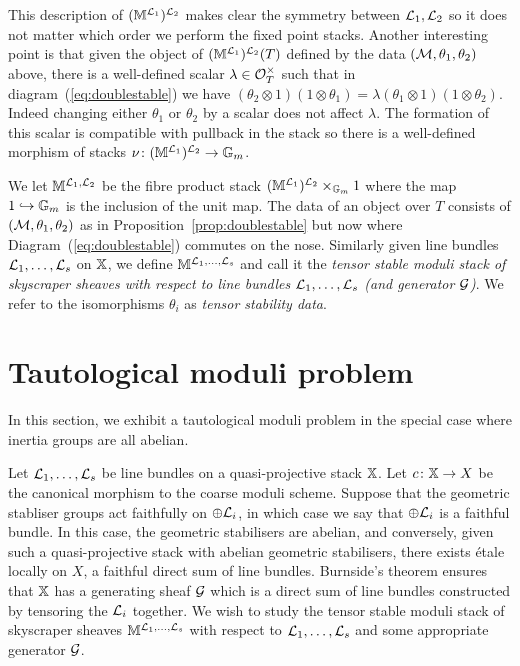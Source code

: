 \documentclass[12pt]{amsart}
\begin{document}
This description of $(\mathbb{M}^{\mathcal{L}_1})^{\mathcal{L}_2}$ makes clear the symmetry between $\mathcal{L}_1, \mathcal{L}_2$ so it does not matter which order we perform the fixed point stacks. Another interesting point is that given the object of $(\mathbb{M}^{\mathcal{L}_1})^{\mathcal{L}_2}(T)$ defined by the data $(\mathcal{M}, \theta_1, \theta_2)$ above, there is a well-defined scalar $\lambda \in \mathcal{O}_T^{\times}$ such that in diagram~(\ref{eq:doublestable}) we have $(\theta_2 \otimes 1) (1 \otimes \theta_1) = \lambda (\theta_1 \otimes 1) (1 \otimes \theta_2)$. Indeed changing either $\theta_1$ or 
$\theta_2$ by a scalar does not affect $\lambda$. The formation of this scalar is compatible with pullback in the stack so there is a well-defined morphism of stacks $\nu \colon (\mathbb{M}^{\mathcal{L}_1})^{\mathcal{L}_2} \rightarrow \mathbb{G}_m$. 

\begin{definition}  \label{defn:doubletensor}
We let $\mathbb{M}^{\mathcal{L}_1,\mathcal{L}_2}$ be the fibre product stack $(\mathbb{M}^{\mathcal{L}_1})^{\mathcal{L}_2} \times_{\mathbb{G}_m} 1$ where the map $1 \hookrightarrow \mathbb{G}_m$ is the inclusion of the unit map. The data of an object over $T$ consists of $(\mathcal{M}, \theta_1, \theta_2)$ as in Proposition~\ref{prop:doublestable} but now where Diagram~(\ref{eq:doublestable}) commutes on the nose. Similarly given line bundles $\mathcal{L}_1,\ldots,\mathcal{L}_s$ on $\mathbb{X}$, we define $\mathbb{M}^{\mathcal{L}_1,\ldots,\mathcal{L}_s}$ and call it the {\em tensor stable moduli stack of skyscraper sheaves with respect to line bundles $\mathcal{L}_1, \ldots, \mathcal{L}_s$ (and generator $\mathcal{G}$)}. We refer to the isomorphisms $\theta_i$ as {\em tensor stability data}.
\end{definition}



\section{Tautological moduli problem}

In this section, we exhibit a tautological moduli problem in the special case where inertia groups are all abelian.

Let $\mathcal{L}_1, \ldots, \mathcal{L}_s$ be line bundles on a quasi-projective stack $\mathbb{X}$. Let $c \colon \mathbb{X} \to X$ be the canonical morphism to the coarse moduli scheme. Suppose that the geometric stabliser groups act faithfully on $\oplus \mathcal{L}_i$, in which case we say that $\oplus \mathcal{L}_i$ is a faithful bundle. In this case, the geometric stabilisers are abelian, and conversely, given such a quasi-projective stack with abelian geometric stabilisers, there exists \'etale locally on $X$, a faithful direct sum of line bundles. Burnside's theorem ensures that $\mathbb{X}$ has a generating sheaf $\mathcal{G}$ which is  a direct sum of line bundles constructed by tensoring the $\mathcal{L}_i$ together. We wish to study the tensor stable moduli stack of skyscraper sheaves $\mathbb{M}^{\mathcal{L}_1,\ldots,\mathcal{L}_s}$ with respect to $\mathcal{L}_1, \ldots, \mathcal{L}_s$ and some appropriate generator $\mathcal{G}$. 
\end{document}
